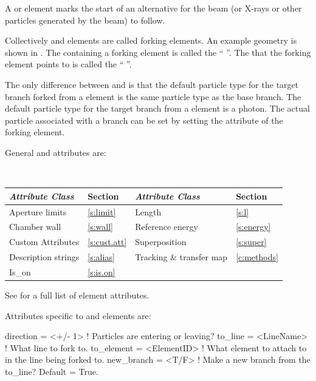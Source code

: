 A  or  element marks the start of an
alternative  for the beam (or X-rays or other
particles generated by the beam) to follow. 

Collectively  and  elements are called
forking elements. An example geometry is shown in .  The
 containing a forking element is called the ``
''. The  that the forking element points to is
called the `` ''. 

The only difference between  and  is that the
default particle type for the target branch forked from a 
element is the same particle type as the base branch. The default
particle type for the target branch from a  element is
a photon. The actual particle associated with a branch can be set by
setting the  attribute of the forking element.

General  and  attributes are:
\begin{center}
\tt
\begin{tabular}{llll} \toprule
  {\sl Attribute Class}      & Section           & {\sl Attribute Class}      & Section         \\ \midrule
  Aperture limits            & \ref{s:limit}     & Length                     & \ref{s:l}       \\
  Chamber wall               & \ref{s:wall}      & Reference energy           & \ref{s:energy}  \\ 
  Custom Attributes          & \ref{s:cust.att}  & Superposition              & \ref{s:super}   \\
  Description strings        & \ref{s:alias}     & Tracking \& transfer map   & \ref{c:methods} \\ 
  Is_on                      & \ref{s:is.on}     &                            &                 \\
  \bottomrule
\end{tabular}
\end{center}
\toffset
See  for a full list of element attributes.

Attributes specific to  and  elements are:
\begin{example}
  direction    = <+/- 1>      ! Particles are entering or leaving?
  to_line      = <LineName>   ! What line to fork to.
  to_element   = <ElementID>  ! What element to attach to in the line being forked to.
  new_branch   = <T/F>        ! Make a new branch from the to_line? Default = True.
\end{example}

